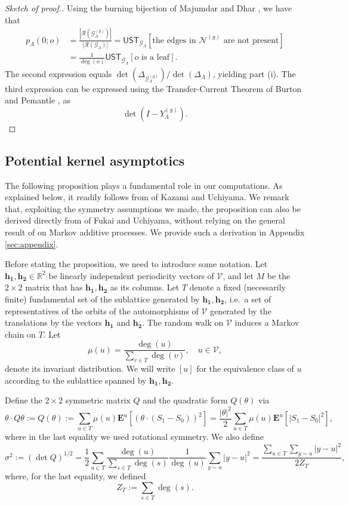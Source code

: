 \documentclass[11pt]{article}
\theoremstyle{remark}
\def\E{\mathbf{E}}
\def\cG{\mathcal{G}}
\def\cN{\mathcal{N}}
\def\cR{\mathcal{R}}
\def\cV{\mathcal{V}}
\newcommand{\eqnst}[1]{\begin{equation*}#1\end{equation*}}
\newcommand{\eqnspl}[2]{\begin{equation}\begin{split}\label{#1}%
   #2\end{split}\end{equation}}
\begin{document}
\begin{proof}[Sketch of proof.]
Using the burning bijection of Majumdar and Dhar \cite{Majumdar1992}, we have that 
\eqnspl{e:UST-prob}{
  p_\Lambda(0; o)
  &= \frac{|\cR(\cG^{(g)}_\Lambda)|}{|\cR(\cG_\Lambda)|}
  = \mathsf{UST}_{\cG_\Lambda} [ \text{the edges in $\cN^{(g)}$ are not present} ] \\
  &= \frac{1}{\deg(o)} \mathsf{UST}_{\cG_\Lambda} [ \text{$o$ is a leaf} ]. }
The second expression equals $\det(\Delta_{\cG^{(g)}_\Lambda})/\det(\Delta_\Lambda)$,
yielding part (i). The third expression can be expressed using the Transfer-Current 
Theorem of Burton and Pemantle \cite{Burton1993}, \cite[Exercise 4.41]{LyonsTrees} as
\eqnst{
  \det( I - Y^{(g)}_\Lambda ). }
\end{proof}


\subsection{Potential kernel asymptotics}
\label{sec:pot-kern}

The following proposition plays a fundamental role in our computations. As explained below, 
it readily follows from \cite[Eqn.~(15)]{KU08} of Kazami and Uchiyama. We remark that, 
exploiting the symmetry assumptions we made, the proposition can also be derived directly 
from \cite[Theorem 2]{FU96} of Fukai and Uchiyama, without relying on the general result 
of \cite[Theorem 2]{U07} on Markov additive processes. We provide such a derivation in
Appendix \ref{sec:appendix}.

Before stating the proposition, we need to introduce some notation. 
Let $\mathbf{h_1}, \mathbf{h_2} \in \mathbb{R}^2$
be linearly independent periodicity vectors of $\cV$, and let $M$ be the $2 \times 2$ matrix 
that has $\mathbf{h_1}, \mathbf{h_2}$ as its columns. Let $T$ denote a fixed 
(necessarily finite) fundamental 
set of the sublattice generated by $\mathbf{h_1}, \mathbf{h_2}$, i.e.~a set of 
representatives of the orbits of the automorphisms of $\cV$ generated by the translations 
by the vectors $\mathbf{h_1}$ and $\mathbf{h_2}$. The random walk on $\cV$ induces a
Markov chain on $T$. Let 
\[ \mu(u) 
   = \frac{\deg(u)}{\sum_{v \in T} \deg(v)}, \quad u \in \cV, \]
denote its invariant distribution.
We will write $[u]$ for the equivalence class of $u$ according to the sublattice spanned by
$\mathbf{h_1}, \mathbf{h_2}$. 

Define the $2 \times 2$ symmetric matrix $Q$ and the quadratic form $Q(\theta)$ via
\[ \theta \cdot Q \theta
   := Q(\theta)
   := \sum_{u \in T} \mu(u)
      \mathbf{E}^u \left[ (\theta \cdot (S_1 - S_0))^2 \right]
   = \frac{|\theta|^2}{2} \sum_{u \in T} \mu(u) \E^u \left[ |S_1-S_0|^2 \right], \]
where in the last equality we used rotational symmetry. We also define
\[ \sigma^2
   := (\det Q)^{1/2}
   = \frac{1}{2} \sum_{u \in T} \frac{\deg(u)}{\sum_{s \in T} \deg(s)} 
     \frac{1}{\deg(u)} \sum_{y \sim u} |y - u|^2
   = \frac{\sum_{u \in T} \sum_{y \sim u} |y - u|^2}{2 Z_T}, \]
where, for the last equality, we defined
\[ Z_T
   := \sum_{s \in T} \deg(s). \]
   
\end{document}
